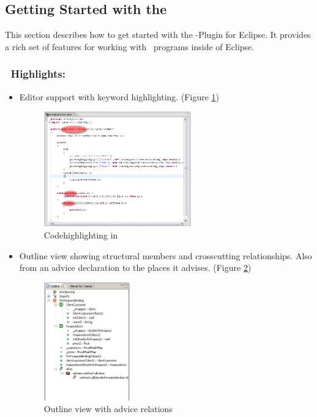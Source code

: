\subsection{Getting Started with the \cjdt}
This section describes how to get started with the \cjdt -Plugin for Eclipse. It provides a rich set of features for working with \caesarj ~programs inside of Eclipse.
\subsubsection{\cjdt ~Highlights:}
\begin{itemize}
	\item Editor support with keyword highlighting. (Figure \ref{fig:hilight})
	
\begin{figure}[htbp]
	\centering
		\includegraphics[width=0.60\textwidth]{images/hilight.png}
	\caption{Codehighlighting in \cjdt}
	\label{fig:hilight}
\end{figure}

  \item Outline view showing structural members and crosscutting relationships. Also from an advice declaration to the places it advises. (Figure \ref{fig:outline})

\begin{figure}[htbp]
	\centering
		\includegraphics[width=0.35\textwidth]{images/outline.png}
	\caption{Outline view with advice relations}
	\label{fig:outline}
\end{figure}


\end{itemize}
